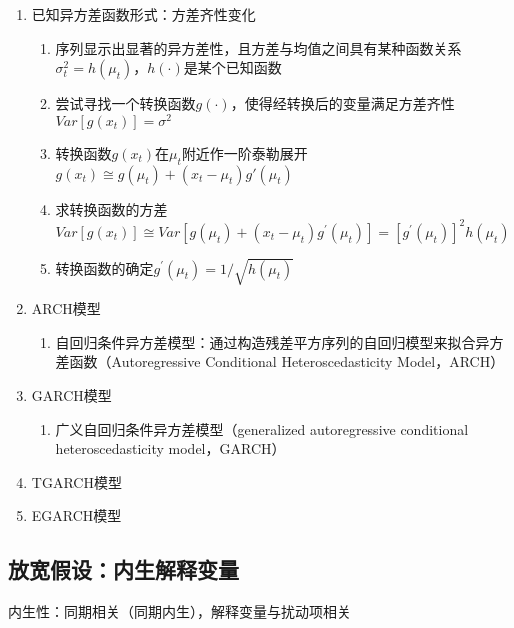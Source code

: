 \documentclass[12pt]{book}
\begin{document}
\begin{enumerate}[1.]
    \item 已知异方差函数形式：方差齐性变化
          \begin{enumerate}[(1)]
              \item 序列显示出显著的异方差性，且方差与均值之间具有某种函数关系$σ_t^2=h(\mu_t)$，$h(⋅)$是某个已知函数
              \item 尝试寻找一个转换函数$g(⋅)$，使得经转换后的变量满足方差齐性$Var[g(x_t)]=\sigma^2$
              \item 转换函数$g(x_t)$在$\mu_t$附近作一阶泰勒展开 $g(x_{t})\cong g(\mu_t)+(x_{t} - \mu_{t} ) g' (\mu_t)$
              \item 求转换函数的方差  $Var[g(x_t)]\cong Var[g(\mu_t)+(x_t-\mu_t)g^{'} (\mu_t)]=[g^{'} (\mu_t)]^2 h(\mu_t)$
              \item 转换函数的确定$g^{'} (\mu_t)=1/\sqrt{h(\mu_t)}$
          \end{enumerate}
    \item ARCH模型
          \begin{enumerate}[(1)]
              \item 自回归条件异方差模型：通过构造残差平方序列的自回归模型来拟合异方差函数（Autoregressive Conditional Heteroscedasticity Model，ARCH）
          \end{enumerate}
    \item GARCH模型
          \begin{enumerate}[(1)]
              \item 广义自回归条件异方差模型（generalized autoregressive conditional heteroscedasticity model，GARCH）
          \end{enumerate}
    \item TGARCH模型
    \item EGARCH模型
\end{enumerate}










\subsection{放宽假设：内生解释变量}








内生性：同期相关（同期内生），解释变量与扰动项相关
\end{document}
